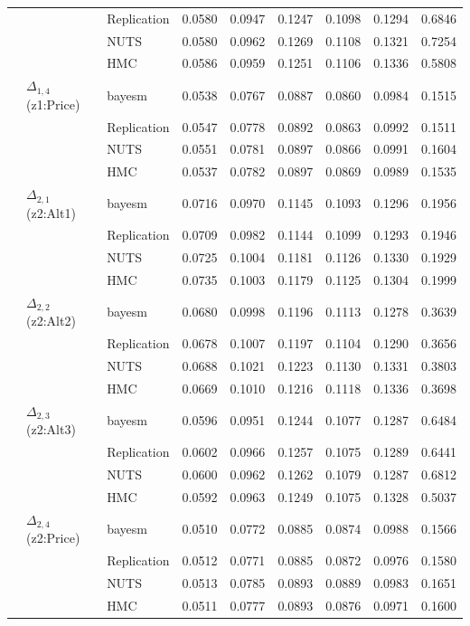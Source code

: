 \begin{longtable}{cllcccccc}
 &  & Replication & 0.0580 & 0.0947 & 0.1247 & 0.1098 & 0.1294 & 0.6846 \\
 &  & NUTS & 0.0580 & 0.0962 & 0.1269 & 0.1108 & 0.1321 & 0.7254 \\
 &  & HMC & 0.0586 & 0.0959 & 0.1251 & 0.1106 & 0.1336 & 0.5808 \\
 & $\Delta_{1,4}$ (z1:Price) & bayesm & 0.0538 & 0.0767 & 0.0887 & 0.0860 & 0.0984 & 0.1515 \\
 &  & Replication & 0.0547 & 0.0778 & 0.0892 & 0.0863 & 0.0992 & 0.1511 \\
 &  & NUTS & 0.0551 & 0.0781 & 0.0897 & 0.0866 & 0.0991 & 0.1604 \\
 &  & HMC & 0.0537 & 0.0782 & 0.0897 & 0.0869 & 0.0989 & 0.1535 \\
 & $\Delta_{2,1}$ (z2:Alt1) & bayesm & 0.0716 & 0.0970 & 0.1145 & 0.1093 & 0.1296 & 0.1956 \\
 &  & Replication & 0.0709 & 0.0982 & 0.1144 & 0.1099 & 0.1293 & 0.1946 \\
 &  & NUTS & 0.0725 & 0.1004 & 0.1181 & 0.1126 & 0.1330 & 0.1929 \\
 &  & HMC & 0.0735 & 0.1003 & 0.1179 & 0.1125 & 0.1304 & 0.1999 \\
 & $\Delta_{2,2}$ (z2:Alt2) & bayesm & 0.0680 & 0.0998 & 0.1196 & 0.1113 & 0.1278 & 0.3639 \\
 &  & Replication & 0.0678 & 0.1007 & 0.1197 & 0.1104 & 0.1290 & 0.3656 \\
 &  & NUTS & 0.0688 & 0.1021 & 0.1223 & 0.1130 & 0.1331 & 0.3803 \\
 &  & HMC & 0.0669 & 0.1010 & 0.1216 & 0.1118 & 0.1336 & 0.3698 \\
 & $\Delta_{2,3}$ (z2:Alt3) & bayesm & 0.0596 & 0.0951 & 0.1244 & 0.1077 & 0.1287 & 0.6484 \\
 &  & Replication & 0.0602 & 0.0966 & 0.1257 & 0.1075 & 0.1289 & 0.6441 \\
 &  & NUTS & 0.0600 & 0.0962 & 0.1262 & 0.1079 & 0.1287 & 0.6812 \\
 &  & HMC & 0.0592 & 0.0963 & 0.1249 & 0.1075 & 0.1328 & 0.5037 \\
 & $\Delta_{2,4}$ (z2:Price) & bayesm & 0.0510 & 0.0772 & 0.0885 & 0.0874 & 0.0988 & 0.1566 \\
 &  & Replication & 0.0512 & 0.0771 & 0.0885 & 0.0872 & 0.0976 & 0.1580 \\
 &  & NUTS & 0.0513 & 0.0785 & 0.0893 & 0.0889 & 0.0983 & 0.1651 \\
 &  & HMC & 0.0511 & 0.0777 & 0.0893 & 0.0876 & 0.0971 & 0.1600 \\

\end{longtable}
